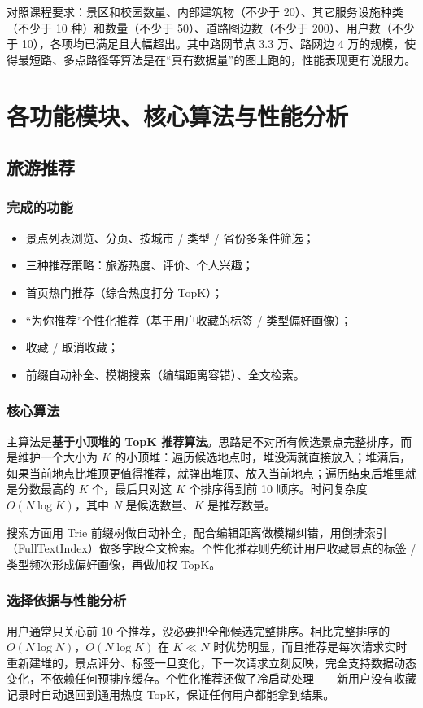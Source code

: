 \documentclass[UTF8,a4paper,12pt]{ctexart}
\begin{document}
对照课程要求：景区和校园数量、内部建筑物（不少于 20）、其它服务设施种类（不少于 10 种）和数量（不少于 50）、道路图边数（不少于 200）、用户数（不少于 10），各项均已满足且大幅超出。其中路网节点 3.3 万、路网边 4 万的规模，使得最短路、多点路径等算法是在“真有数据量”的图上跑的，性能表现更有说服力。

\section{各功能模块、核心算法与性能分析}

\subsection{旅游推荐}

\subsubsection{完成的功能}
\begin{itemize}
\item 景点列表浏览、分页、按城市 / 类型 / 省份多条件筛选；
\item 三种推荐策略：旅游热度、评价、个人兴趣；
\item 首页热门推荐（综合热度打分 TopK）；
\item “为你推荐”个性化推荐（基于用户收藏的标签 / 类型偏好画像）；
\item 收藏 / 取消收藏；
\item 前缀自动补全、模糊搜索（编辑距离容错）、全文检索。
\end{itemize}

\subsubsection{核心算法}
主算法是\textbf{基于小顶堆的 TopK 推荐算法}。思路是不对所有候选景点完整排序，而是维护一个大小为 $K$ 的小顶堆：遍历候选地点时，堆没满就直接放入；堆满后，如果当前地点比堆顶更值得推荐，就弹出堆顶、放入当前地点；遍历结束后堆里就是分数最高的 $K$ 个，最后只对这 $K$ 个排序得到前 10 顺序。时间复杂度 $O(N\log K)$，其中 $N$ 是候选数量、$K$ 是推荐数量。

搜索方面用 Trie 前缀树做自动补全，配合编辑距离做模糊纠错，用倒排索引（FullTextIndex）做多字段全文检索。个性化推荐则先统计用户收藏景点的标签 / 类型频次形成偏好画像，再做加权 TopK。

\subsubsection{选择依据与性能分析}
用户通常只关心前 10 个推荐，没必要把全部候选完整排序。相比完整排序的 $O(N\log N)$，$O(N\log K)$ 在 $K \ll N$ 时优势明显，而且推荐是每次请求实时重新建堆的，景点评分、标签一旦变化，下一次请求立刻反映，完全支持数据动态变化，不依赖任何预排序缓存。个性化推荐还做了冷启动处理——新用户没有收藏记录时自动退回到通用热度 TopK，保证任何用户都能拿到结果。
\end{document}
